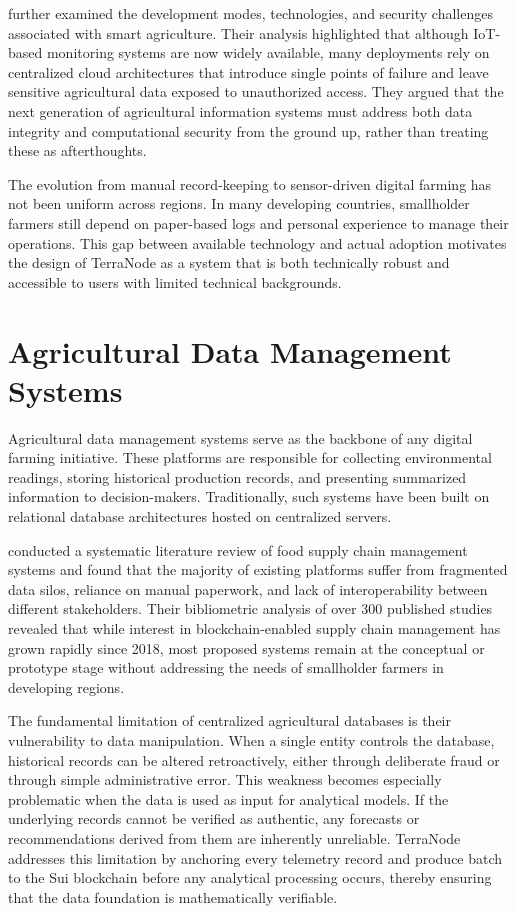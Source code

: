 \textcite{raj2022survey} further examined the development modes, technologies, and security challenges associated with smart agriculture. Their analysis highlighted that although IoT-based monitoring systems are now widely available, many deployments rely on centralized cloud architectures that introduce single points of failure and leave sensitive agricultural data exposed to unauthorized access. They argued that the next generation of agricultural information systems must address both data integrity and computational security from the ground up, rather than treating these as afterthoughts.

The evolution from manual record-keeping to sensor-driven digital farming has not been uniform across regions. In many developing countries, smallholder farmers still depend on paper-based logs and personal experience to manage their operations. This gap between available technology and actual adoption motivates the design of TerraNode as a system that is both technically robust and accessible to users with limited technical backgrounds.

\section{Agricultural Data Management Systems}

Agricultural data management systems serve as the backbone of any digital farming initiative. These platforms are responsible for collecting environmental readings, storing historical production records, and presenting summarized information to decision-makers. Traditionally, such systems have been built on relational database architectures hosted on centralized servers.

\textcite{sharma2023blockchain} conducted a systematic literature review of food supply chain management systems and found that the majority of existing platforms suffer from fragmented data silos, reliance on manual paperwork, and lack of interoperability between different stakeholders. Their bibliometric analysis of over 300 published studies revealed that while interest in blockchain-enabled supply chain management has grown rapidly since 2018, most proposed systems remain at the conceptual or prototype stage without addressing the needs of smallholder farmers in developing regions.

The fundamental limitation of centralized agricultural databases is their vulnerability to data manipulation. When a single entity controls the database, historical records can be altered retroactively, either through deliberate fraud or through simple administrative error. This weakness becomes especially problematic when the data is used as input for analytical models. If the underlying records cannot be verified as authentic, any forecasts or recommendations derived from them are inherently unreliable. TerraNode addresses this limitation by anchoring every telemetry record and produce batch to the Sui blockchain before any analytical processing occurs, thereby ensuring that the data foundation is mathematically verifiable.

